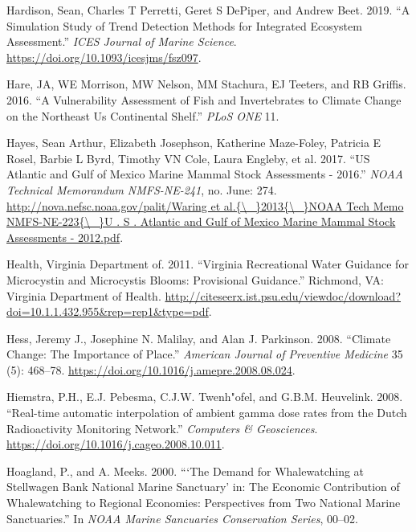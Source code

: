 \documentclass[
]{book}
\begin{document}
\leavevmode\hypertarget{ref-hardison2019}{}%
Hardison, Sean, Charles T Perretti, Geret S DePiper, and Andrew Beet. 2019. ``A Simulation Study of Trend Detection Methods for Integrated Ecosystem Assessment.'' \emph{ICES Journal of Marine Science}. \url{https://doi.org/10.1093/icesjms/fsz097}.

\leavevmode\hypertarget{ref-Hare2016}{}%
Hare, JA, WE Morrison, MW Nelson, MM Stachura, EJ Teeters, and RB Griffis. 2016. ``A Vulnerability Assessment of Fish and Invertebrates to Climate Change on the Northeast Us Continental Shelf.'' \emph{PLoS ONE} 11.

\leavevmode\hypertarget{ref-Hayes2017}{}%
Hayes, Sean Arthur, Elizabeth Josephson, Katherine Maze-Foley, Patricia E Rosel, Barbie L Byrd, Timothy VN Cole, Laura Engleby, et al. 2017. ``US Atlantic and Gulf of Mexico Marine Mammal Stock Assessments - 2016.'' \emph{NOAA Technical Memorandum NMFS-NE-241}, no. June: 274. \href{http://nova.nefsc.noaa.gov/palit/Waring\%20et\%20al.\%7B/_\%7D2013\%7B/_\%7DNOAA\%20Tech\%20Memo\%20NMFS-NE-223\%7B/_\%7DU\%20.\%20S\%20.\%20Atlantic\%20and\%20Gulf\%20of\%20Mexico\%20Marine\%20Mammal\%20Stock\%20Assessments\%20-\%202012.pdf}{http://nova.nefsc.noaa.gov/palit/Waring et al.\{\textbackslash{}\_\}2013\{\textbackslash{}\_\}NOAA Tech Memo NMFS-NE-223\{\textbackslash{}\_\}U . S . Atlantic and Gulf of Mexico Marine Mammal Stock Assessments - 2012.pdf}.

\leavevmode\hypertarget{ref-VDH2011}{}%
Health, Virginia Department of. 2011. ``Virginia Recreational Water Guidance for Microcystin and Microcystis Blooms: Provisional Guidance.'' Richmond, VA: Virginia Department of Health. \url{http://citeseerx.ist.psu.edu/viewdoc/download?doi=10.1.1.432.955\&rep=rep1\&type=pdf}.

\leavevmode\hypertarget{ref-hess_climate_2008}{}%
Hess, Jeremy J., Josephine N. Malilay, and Alan J. Parkinson. 2008. ``Climate Change: The Importance of Place.'' \emph{American Journal of Preventive Medicine} 35 (5): 468--78. \url{https://doi.org/10.1016/j.amepre.2008.08.024}.

\leavevmode\hypertarget{ref-automap}{}%
Hiemstra, P.H., E.J. Pebesma, C.J.W. Twenh"ofel, and G.B.M. Heuvelink. 2008. ``Real-time automatic interpolation of ambient gamma dose rates from the Dutch Radioactivity Monitoring Network.'' \emph{Computers \& Geosciences}. \url{https://doi.org/10.1016/j.cageo.2008.10.011}.

\leavevmode\hypertarget{ref-hoagland_demand_2000}{}%
Hoagland, P., and A. Meeks. 2000. ```The Demand for Whalewatching at Stellwagen Bank National Marine Sanctuary' in: The Economic Contribution of Whalewatching to Regional Economies: Perspectives from Two National Marine Sanctuaries.'' In \emph{NOAA Marine Sancuaries Conservation Series}, 00--02.
\end{document}
